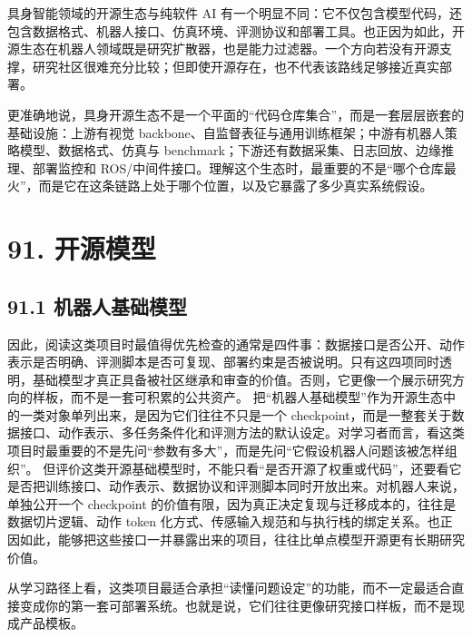

具身智能领域的开源生态与纯软件 AI 有一个明显不同：它不仅包含模型代码，还包含数据格式、机器人接口、仿真环境、评测协议和部署工具。也正因为如此，开源生态在机器人领域既是研究扩散器，也是能力过滤器。一个方向若没有开源支撑，研究社区很难充分比较；但即使开源存在，也不代表该路线足够接近真实部署。

更准确地说，具身开源生态不是一个平面的“代码仓库集合”，而是一套层层嵌套的基础设施：上游有视觉 backbone、自监督表征与通用训练框架；中游有机器人策略模型、数据格式、仿真与 benchmark；下游还有数据采集、日志回放、边缘推理、部署监控和 ROS/中间件接口。理解这个生态时，最重要的不是“哪个仓库最火”，而是它在这条链路上处于哪个位置，以及它暴露了多少真实系统假设。

\section*{91. 开源模型}

\subsection*{91.1 机器人基础模型}


因此，阅读这类项目时最值得优先检查的通常是四件事：数据接口是否公开、动作表示是否明确、评测脚本是否可复现、部署约束是否被说明。只有这四项同时透明，基础模型才真正具备被社区继承和审查的价值。否则，它更像一个展示研究方向的样板，而不是一套可积累的公共资产。 把“机器人基础模型”作为开源生态中的一类对象单列出来，是因为它们往往不只是一个 checkpoint，而是一整套关于数据接口、动作表示、多任务条件化和评测方法的默认设定。对学习者而言，看这类项目时最重要的不是先问“参数有多大”，而是先问“它假设机器人问题该被怎样组织”。 但评价这类开源基础模型时，不能只看“是否开源了权重或代码”，还要看它是否把训练接口、动作表示、数据协议和评测脚本同时开放出来。对机器人来说，单独公开一个 checkpoint 的价值有限，因为真正决定复现与迁移成本的，往往是数据切片逻辑、动作 token 化方式、传感输入规范和与执行栈的绑定关系。也正因如此，能够把这些接口一并暴露出来的项目，往往比单点模型开源更有长期研究价值。

从学习路径上看，这类项目最适合承担“读懂问题设定”的功能，而不一定最适合直接变成你的第一套可部署系统。也就是说，它们往往更像研究接口样板，而不是现成产品模板。

